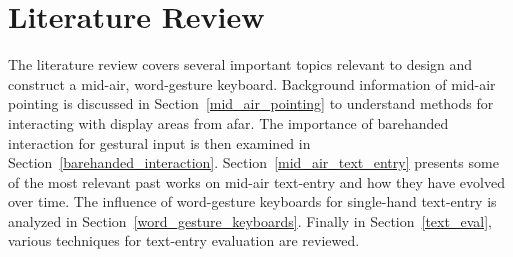 \chapter{Literature Review} \label{literature_review}
\hspace{\parindent}The literature review covers several important topics relevant to design and construct a mid-air, word-gesture keyboard. Background information of mid-air pointing is discussed in Section~\ref{mid_air_pointing} to understand methods for interacting with display areas from afar. The importance of barehanded interaction for gestural input is then examined in Section~\ref{barehanded_interaction}. Section~\ref{mid_air_text_entry} presents some of the most relevant past works on mid-air text-entry and how they have evolved over time. The influence of word-gesture keyboards for single-hand text-entry is analyzed in Section~\ref{word_gesture_keyboards}. Finally in Section~\ref{text_eval}, various techniques for text-entry evaluation are reviewed.

